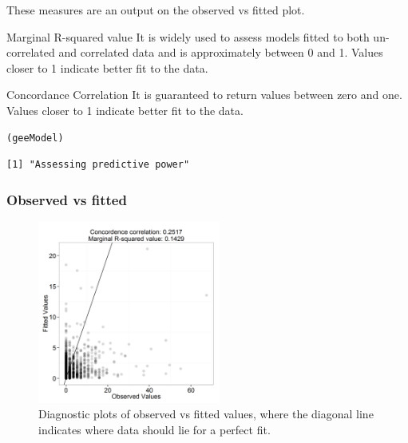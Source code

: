 \begin{frame}[fragile]
\frametitle{}
These measures are an output on the observed vs fitted plot. 

\begin{block}{Marginal R-squared value}
It is widely used to assess models fitted to both un-correlated and correlated data and is approximately between 0 and 1.  Values closer to 1 indicate better fit to the data.
\end{block}

\begin{block}{Concordance Correlation}
It is guaranteed to return values between zero and one.  Values closer to 1 indicate better fit to the data.
\end{block}

\begin{knitrout}\footnotesize
{}\color{fgcolor}\begin{kframe}
\begin{alltt}
(geeModel)
\end{alltt}
\begin{verbatim}
[1] "Assessing predictive power"
\end{verbatim}
\end{kframe}
\end{knitrout}

\end{frame}

\begin{frame}[fragile]
\frametitle{Observed vs fitted}
\begin{figure}[h]
  \centering
    \includegraphics[width=6cm]{FitPlots_fitted.png}
  \caption{Diagnostic plots of observed vs fitted values, where the diagonal line indicates where data should lie for a perfect fit.}
  \label{fig:diagplots}
\end{figure}
\end{frame}

